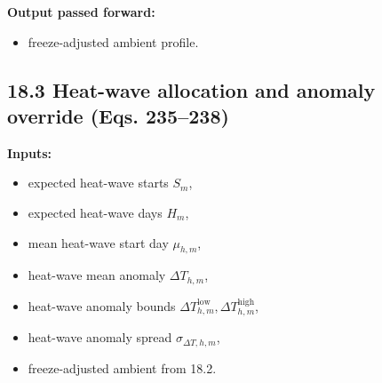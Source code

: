 \documentclass[11pt]{article}
\begin{document}
\textbf{Output passed forward:}
\begin{itemize}[leftmargin=*]
\item freeze-adjusted ambient profile.
\end{itemize}

\subsection*{18.3 Heat-wave allocation and anomaly override (Eqs. 235--238)}
\textbf{Inputs:}
\begin{itemize}[leftmargin=*]
\item expected heat-wave starts \(S_m\),
\item expected heat-wave days \(H_m\),
\item mean heat-wave start day \(\mu_{h,m}\),
\item heat-wave mean anomaly \(\Delta T_{h,m}\),
\item heat-wave anomaly bounds \(\Delta T_{h,m}^{\mathrm{low}},\Delta T_{h,m}^{\mathrm{high}}\),
\item heat-wave anomaly spread \(\sigma_{\Delta T,h,m}\),
\item freeze-adjusted ambient from 18.2.
\end{itemize}
\end{document}

